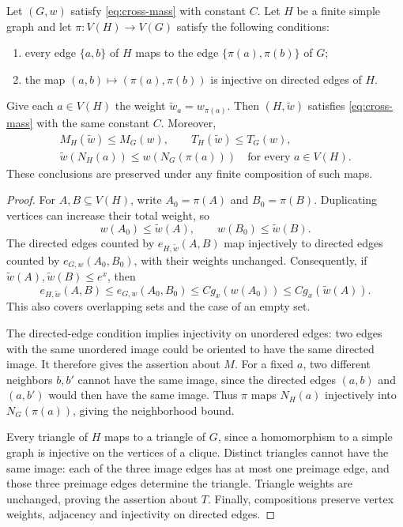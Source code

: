 \begin{lemma}
\label{lem:invariant-preservation}
Let $(G,w)$ satisfy \eqref{eq:cross-mass} with constant $C$.
Let $H$ be a finite simple graph and let $\pi:V(H)\to V(G)$ satisfy
the following conditions:
\begin{enumerate}
 \item every edge $\{a,b\}$ of $H$ maps to the edge
       $\{\pi(a),\pi(b)\}$ of $G$;
 \item the map $(a,b)\mapsto(\pi(a),\pi(b))$ is injective on
       directed edges of $H$.
\end{enumerate}
Give each $a\in V(H)$ the weight $\widetilde w_a=w_{\pi(a)}$.
Then $(H,\widetilde w)$ satisfies
\eqref{eq:cross-mass} with the same constant $C$.  Moreover,
\begin{gather*}
 M_H(\widetilde w)\le M_G(w),\qquad
 T_H(\widetilde w)\le T_G(w),\\
 \widetilde w(N_H(a))\le w(N_G(\pi(a)))
 \quad\text{for every }a\in V(H).
\end{gather*}
These conclusions are preserved under any finite composition of such maps.
\end{lemma}

\begin{proof}
For $A,B\subseteq V(H)$, write $A_0=\pi(A)$ and $B_0=\pi(B)$.
Duplicating vertices can increase their total weight, so
\[
 w(A_0)\le\widetilde w(A),\qquad
 w(B_0)\le\widetilde w(B).
\]
The directed edges counted by $e_{H,\widetilde w}(A,B)$ map injectively
to directed edges counted by $e_{G,w}(A_0,B_0)$, with their weights
unchanged.  Consequently, if $\widetilde w(A),\widetilde w(B)\le e^x$,
then
\[
 e_{H,\widetilde w}(A,B)
 \le e_{G,w}(A_0,B_0)
 \le Cg_x(w(A_0))
 \le Cg_x(\widetilde w(A)).
\]
This also covers overlapping sets and the case of an empty set.

The directed-edge condition implies injectivity on unordered edges:
two edges with the same unordered image could be oriented to have the
same directed image.  It therefore gives the assertion about $M$.
For a fixed $a$, two different neighbors $b,b'$ cannot have the same
image, since the directed edges $(a,b)$ and $(a,b')$ would then have the
same image.  Thus $\pi$ maps $N_H(a)$ injectively into $N_G(\pi(a))$,
giving the neighborhood bound.

Every triangle of $H$ maps to a triangle of $G$, since a homomorphism
to a simple graph is injective on the vertices of a clique.  Distinct
triangles cannot have the same image: each of the three image edges
has at most one preimage edge, and those three preimage edges determine
the triangle.  Triangle weights are unchanged, proving the assertion
about $T$.  Finally, compositions preserve vertex weights,
adjacency and injectivity on directed edges.
\end{proof}

